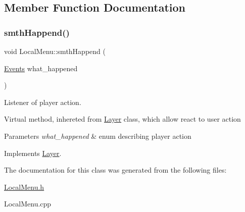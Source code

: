 \subsection{Member Function Documentation}
\mbox{\label{class_local_menu_ad6db1f0ae5757a4e25269d40f6e369af}} 
\subsubsection{\texorpdfstring{smth\+Happend()}{smthHappend()}}
{\footnotesize\ttfamily void Local\+Menu\+::smth\+Happend (\begin{DoxyParamCaption}\item[{\hyperlink{_events_8h_af60e00b78607064c5be6aa9397ea49c1}{Events}}]{what\+\_\+happened }\end{DoxyParamCaption})\hspace{0.3cm}{\ttfamily [virtual]}}



Listener of player action. 

Virtual method, inhereted from \hyperlink{class_layer}{Layer} class, which allow react to user action 
\begin{DoxyParams}{Parameters}
{\em what\+\_\+happened} & enum describing player action \\
\hline
\end{DoxyParams}


Implements \hyperlink{class_layer_a41318993a0f6c7ba3bc6d964f7802c10}{Layer}.



The documentation for this class was generated from the following files\+:\begin{DoxyCompactItemize}
\item 
\hyperlink{_local_menu_8h}{Local\+Menu.\+h}\item 
Local\+Menu.\+cpp\end{DoxyCompactItemize}

